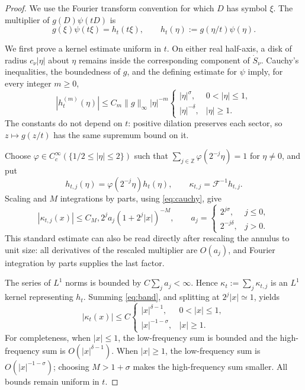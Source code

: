 \documentclass[11pt]{article}
\newcommand{\F}{\mathcal F}
\newcommand{\1}{\mathbf 1}
\begin{document}
\begin{proof}
We use the Fourier transform convention for which $D$ has symbol $\xi$.
The multiplier of $g(D)\psi(tD)$ is
\[
 g(\xi)\psi(t\xi)=h_t(t\xi),
 \qquad h_t(\eta):=g(\eta/t)\psi(\eta).
\]

We first prove a kernel estimate uniform in $t$.  On either real half-axis,
a disk of radius $c_\nu|\eta|$ about $\eta$ remains inside the corresponding
component of $\dot S_\nu$.  Cauchy's inequalities, the boundedness of $g$,
and the defining estimate for $\psi$ imply, for every integer $m\ge0$,
\begin{equation}\label{eq:cauchy}
 |h_t^{(m)}(\eta)|\le C_m\|g\|_\infty |\eta|^{-m}
 \begin{cases}
 |\eta|^\sigma,&0<|\eta|\le1,\\
 |\eta|^{-\delta},&|\eta|\ge1.
 \end{cases}
\end{equation}
The constants do not depend on $t$: positive dilation preserves each sector,
so $z\mapsto g(z/t)$ has the same supremum bound on it.

Choose $\varphi\in C_c^\infty(\{1/2\le|\eta|\le2\})$ such that
$\sum_{j\in\mathbb Z}\varphi(2^{-j}\eta)=1$ for $\eta\ne0$, and put
\[
 h_{t,j}(\eta)=\varphi(2^{-j}\eta)h_t(\eta),
 \qquad \kappa_{t,j}=\F^{-1}h_{t,j}.
\]
Scaling and $M$ integrations by parts, using \eqref{eq:cauchy}, give
\begin{equation}\label{eq:band}
 |\kappa_{t,j}(x)|\le C_M,2^j a_j(1+2^j|x|)^{-M},
 \qquad
 a_j=\begin{cases}2^{j\sigma},&j\le0,\\2^{-j\delta},&j>0.
 \end{cases}
\end{equation}
This standard estimate can also be read directly after rescaling the
annulus to unit size: all derivatives of the rescaled multiplier are
$O(a_j)$, and Fourier integration by parts supplies the last factor.

The series of $L^1$ norms is bounded by $C\sum_j a_j<\infty$.  Hence
$\kappa_t:=\sum_j\kappa_{t,j}$ is an $L^1$ kernel representing $h_t$.
Summing \eqref{eq:band}, and splitting at $2^j|x|\simeq1$, yields
\begin{equation}\label{eq:kernel}
 |\kappa_t(x)|\le C
 \begin{cases}
 |x|^{\delta-1},&0<|x|\le1,\\
 |x|^{-1-\sigma},&|x|\ge1.
 \end{cases}
\end{equation}
For completeness, when $|x|\le1$, the low-frequency sum is bounded and the
high-frequency sum is $O(|x|^{\delta-1})$.  When $|x|\ge1$, the low-frequency
sum is $O(|x|^{-1-\sigma})$; choosing $M>1+\sigma$ makes the high-frequency
sum smaller.  All bounds remain uniform in $t$.


\end{proof}
\end{document}
